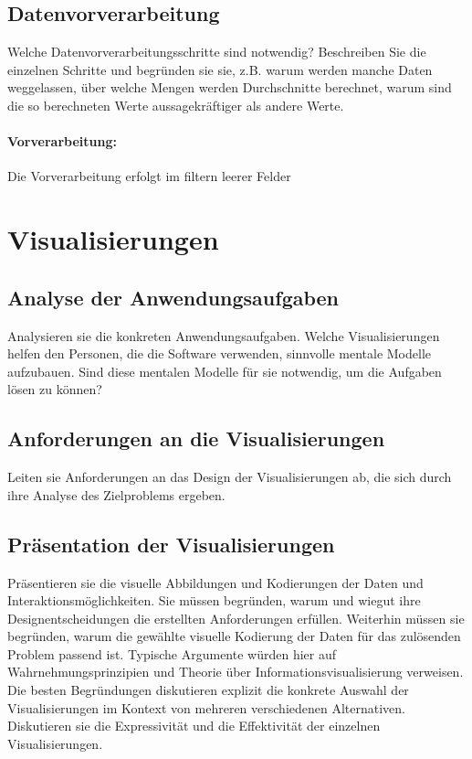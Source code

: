 \documentclass[usegeometry=true]{scrartcl}
\begin{document}
\subsection{Datenvorverarbeitung}
Welche Datenvorverarbeitungsschritte sind notwendig? Beschreiben Sie die einzelnen Schritte und begründen sie sie, z.B. warum werden manche Daten weggelassen, über welche Mengen werden Durchschnitte berechnet, warum sind die so berechneten Werte aussagekräftiger als andere Werte. 

\paragraph{Vorverarbeitung:} Die Vorverarbeitung erfolgt im filtern leerer Felder

\section{Visualisierungen}
\subsection{Analyse der Anwendungsaufgaben}
Analysieren sie die konkreten Anwendungsaufgaben. Welche Visualisierungen helfen den Personen, die die Software verwenden, sinnvolle mentale Modelle aufzubauen. Sind diese mentalen Modelle für sie notwendig, um die Aufgaben lösen zu können?
\subsection{Anforderungen an die Visualisierungen}
Leiten sie Anforderungen an das Design der Visualisierungen ab, die sich durch ihre Analyse des Zielproblems ergeben.
\subsection{Präsentation der Visualisierungen}
Präsentieren sie die visuelle Abbildungen und Kodierungen der Daten und Interaktionsmöglichkeiten. 
Sie müssen  begründen, warum und wiegut ihre Designentscheidungen die erstellten Anforderungen erfüllen. 
Weiterhin müssen sie begründen, warum die gewählte visuelle Kodierung der Daten für das zulösenden Problem passend ist. 
Typische Argumente würden hier auf Wahrnehmungsprinzipien und Theorie über Informationsvisualisierung verweisen. 
Die besten Begründungen diskutieren explizit die konkrete Auswahl der Visualisierungen im Kontext von mehreren verschiedenen Alternativen. Diskutieren sie die Expressivität und die Effektivität der einzelnen Visualisierungen. 
\end{document}
